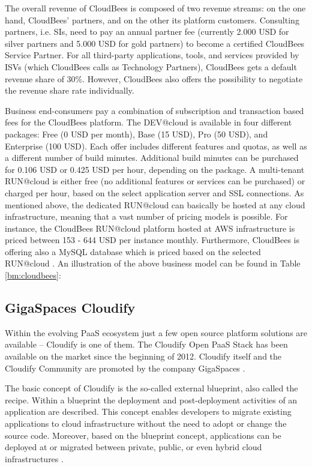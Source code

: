 The overall revenue of CloudBees is composed of two revenue streams: on the one hand, CloudBees' partners, and on the other its platform customers. Consulting partners, i.e. \acp{SI}, need to pay an annual partner fee (currently 2.000 \ac{USD} for silver partners and 5.000 \ac{USD} for gold partners) to become a certified CloudBees Service Partner. For all third-party applications, tools, and services provided by \acp{ISV} (which CloudBees calls as Technology Partners), CloudBees gets a default revenue share of 30\%. However, CloudBees also offers the possibility to negotiate the revenue share rate individually.

Business end-consumers pay a combination of subscription and transaction based fees for the CloudBees platform. The DEV@cloud is available in four different packages: Free (0 \ac{USD} per month), Base (15 \ac{USD}), Pro (50 \ac{USD}), and Enterprise (100 \ac{USD}). Each offer includes different features and quotas, as well as a different number of build minutes. Additional build minutes can be purchased for 0.106 \ac{USD} or 0.425 \ac{USD} per hour, depending on the package. A multi-tenant RUN@cloud is either free (no additional features or services can be purchased) or charged per hour, based on the select application server and SSL connections. As mentioned above, the dedicated RUN@cloud can basically be hosted at any cloud infrastructure, meaning that a vast number of pricing models is possible. For instance, the CloudBees RUN@cloud platform hosted at \ac{AWS} infrastructure is priced between 153 - 644 \ac{USD} per instance monthly. Furthermore, CloudBees is offering also a MySQL database which is priced based on the selected RUN@cloud \citep{CloudBees2013}. An illustration of the above business model can be found in Table \ref{bm:cloudbees}:



\subsection{GigaSpaces Cloudify}\label{ch:sota:gsc}

Within the evolving \ac{PaaS} ecosystem just a few open source platform solutions are available -- Cloudify is one of them. The Cloudify Open \ac{PaaS} Stack has been available on the market since the beginning of 2012. Cloudify itself and the Cloudify Community are promoted by the company GigaSpaces \citep{GigaSpaces2013a}.

The basic concept of Cloudify is the so-called external blueprint, also called the recipe. Within a blueprint the deployment and post-deployment activities of an application are described. This concept enables developers to migrate existing applications to cloud infrastructure without the need to adopt or change the source code. Moreover, based on the blueprint concept, applications can be deployed at or migrated between private, public, or even hybrid cloud infrastructures \citep{GigaSpaces2013a}.

